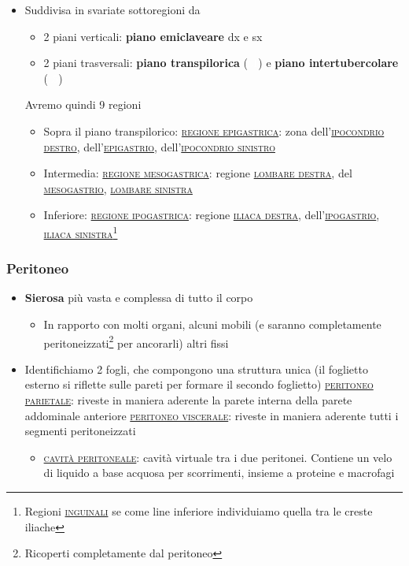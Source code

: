 \documentclass[italian,]{article}
\providecommand{\tightlist}{%
  \setlength{\itemsep}{0pt}\setlength{\parskip}{0pt}}
\newcommand{\oss}[1]{\colorbox{ossa}{\textcolor{white}{\textsc{#1}}}}
\renewcommand{\a}[1]{\underline{\textsc{#1}}}
\begin{document}
\begin{itemize}
\tightlist
\item
  Suddivisa in svariate sottoregioni da

  \begin{itemize}
  \tightlist
  \item
    2 piani verticali: \textbf{piano emiclaveare} dx e sx
  \item
    2 piani trasversali: \textbf{piano transpilorica} (\oss{l1}) e
    \textbf{piano intertubercolare} (\oss{l5})
  \end{itemize}

  Avremo quindi 9 regioni

  \begin{itemize}
  \tightlist
  \item
    Sopra il piano transpilorico: \a{regione epigastrica}: zona
    dell'\a{ipocondrio destro}, dell'\a{epigastrio},
    dell'\a{ipocondrio sinistro}
  \item
    Intermedia: \a{regione mesogastrica}: regione \a{lombare destra},
    del \a{mesogastrio}, \a{lombare sinistra}
  \item
    Inferiore: \a{regione ipogastrica}: regione \a{iliaca destra},
    dell'\a{ipogastrio}, \a{iliaca sinistra}\footnote{Regioni
      \a{inguinali} se come line inferiore individuiamo quella tra le
      creste iliache}
  \end{itemize}
\end{itemize}

\hypertarget{peritoneo}{%
\subsubsection{Peritoneo}\label{peritoneo}}

\begin{itemize}
\tightlist
\item
  \textbf{Sierosa} più vasta e complessa di tutto il corpo

  \begin{itemize}
  \tightlist
  \item
    In rapporto con molti organi, alcuni mobili (e saranno completamente
    peritoneizzati\footnote{Ricoperti completamente dal peritoneo} per
    ancorarli) altri fissi
  \end{itemize}
\item
  Identifichiamo 2 fogli, che compongono una struttura unica (il
  foglietto esterno si riflette sulle pareti per formare il secondo
  foglietto) \a{peritoneo parietale}: riveste in maniera aderente la
  parete interna della parete addominale anteriore
  \a{peritoneo viscerale}: riveste in maniera aderente tutti i segmenti
  peritoneizzati

  \begin{itemize}
  \tightlist
  \item
    \a{cavità peritoneale}: cavità virtuale tra i due peritonei.
    Contiene un velo di liquido a base acquosa per scorrimenti, insieme
    a proteine e macrofagi
  \end{itemize}
\end{itemize}
\end{document}
